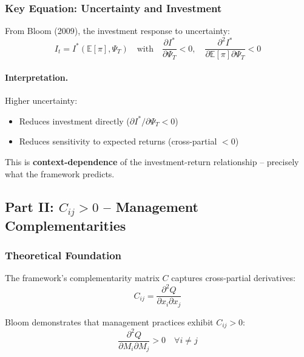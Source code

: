 \subsubsection{Key Equation: Uncertainty and Investment}

From Bloom (2009), the investment response to uncertainty:
\begin{equation}
I_t = I^*(\mathbb{E}[\pi], \Psi_T) \quad \text{with} \quad 
\frac{\partial I^*}{\partial \Psi_T} < 0, \quad
\frac{\partial^2 I^*}{\partial \mathbb{E}[\pi] \partial \Psi_T} < 0
\label{eq:bloom-investment}
\end{equation}

\paragraph{Interpretation.}
Higher uncertainty:
\begin{itemize}
    \item Reduces investment directly ($\partial I^*/\partial \Psi_T < 0$)
    \item Reduces sensitivity to expected returns (cross-partial $< 0$)
\end{itemize}

This is \textbf{context-dependence} of the investment-return relationship – 
precisely what the framework predicts.

\subsection{Part II: $C_{ij} > 0$ – Management Complementarities}

\subsubsection{Theoretical Foundation}

The framework's complementarity matrix $C$ captures cross-partial derivatives:
\begin{equation}
C_{ij} = \frac{\partial^2 Q}{\partial x_i \partial x_j}
\end{equation}

Bloom demonstrates that management practices exhibit $C_{ij} > 0$:
\begin{equation}
\boxed{
\frac{\partial^2 Q}{\partial M_i \partial M_j} > 0 \quad \forall i \neq j
}
\label{eq:bloom-complementarity}
\end{equation}

